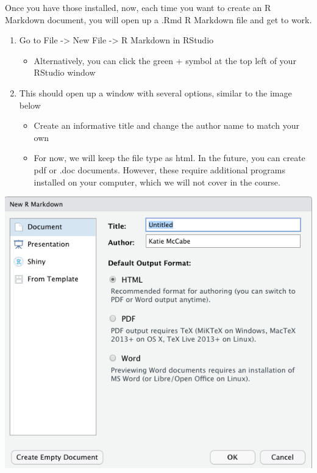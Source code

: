 \documentclass[
  letterpaper,
  DIV=11,
  numbers=noendperiod]{scrreprt}
\providecommand{\tightlist}{%
  \setlength{\itemsep}{0pt}\setlength{\parskip}{0pt}}\usepackage{longtable,booktabs,array}
\begin{document}
Once you have those installed, now, each time you want to create an R
Markdown document, you will open up a .Rmd R Markdown file and get to
work.

\begin{enumerate}
\def\labelenumi{\arabic{enumi}.}
\tightlist
\item
  Go to File -\textgreater{} New File -\textgreater{} R Markdown in
  RStudio

  \begin{itemize}
  \tightlist
  \item
    Alternatively, you can click the green + symbol at the top left of
    your RStudio window
  \end{itemize}
\item
  This should open up a window with several options, similar to the
  image below

  \begin{itemize}
  \tightlist
  \item
    Create an informative title and change the author name to match your
    own
  \item
    For now, we will keep the file type as html. In the future, you can
    create pdf or .doc documents. However, these require additional
    programs installed on your computer, which we will not cover in the
    course.
  \end{itemize}
\end{enumerate}

\includegraphics{images/rmarkdownnewfile.png}
\end{document}
